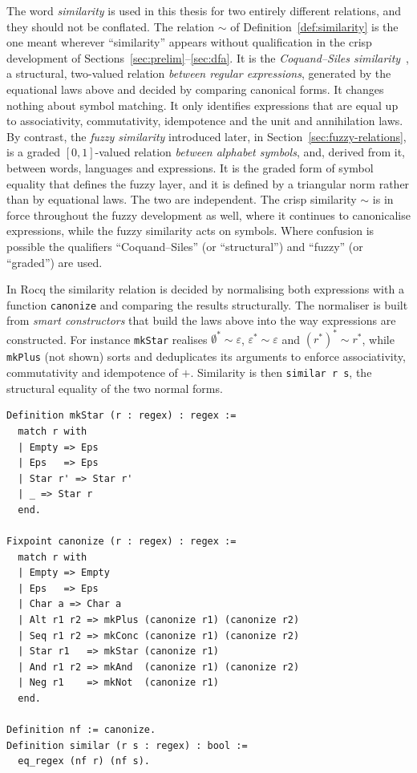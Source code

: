 \begin{remark}\label{rem:two-similarities}
The word \emph{similarity} is used in this thesis for two entirely different
relations, and they should not be conflated. The relation $\sim$ of
Definition~\ref{def:similarity} is the one meant wherever ``similarity''
appears without qualification in the crisp development of
Sections~\ref{sec:prelim}--\ref{sec:dfa}. It is the \emph{Coquand--Siles
similarity}~\cite{CoquandRegexEquality}, a structural, two-valued relation
\emph{between regular expressions}, generated by the equational laws above and
decided by comparing canonical forms. It changes nothing about symbol matching. It
only identifies expressions that are equal up to associativity, commutativity,
idempotence and the unit and annihilation laws. By contrast, the \emph{fuzzy similarity} 
introduced later, in
Section~\ref{sec:fuzzy-relations}, is a graded $[0,1]$-valued relation
\emph{between alphabet symbols}, and, derived from it, between words, languages and
expressions. It is the graded form of symbol equality that defines the fuzzy layer,
and it is defined by a triangular norm rather than by equational laws. The two are
independent. The crisp similarity $\sim$ is in force throughout the fuzzy
development as well, where it continues to canonicalise expressions, while the fuzzy
similarity acts on symbols. Where confusion is possible the qualifiers
``Coquand--Siles'' (or ``structural'') and ``fuzzy'' (or ``graded'') are used.
\end{remark}

In Rocq the similarity relation is decided by normalising both expressions with a
function \texttt{canonize} and comparing the results structurally. The normaliser
is built from \emph{smart constructors} that build the laws above into the way
expressions are constructed. For instance \texttt{mkStar} realises
$\emptyset^{*}\sim\varepsilon$, $\varepsilon^{*}\sim\varepsilon$ and
$(r^{*})^{*}\sim r^{*}$, while \texttt{mkPlus} (not shown) sorts and deduplicates
its arguments to enforce associativity, commutativity and idempotence of $+$.
Similarity is then \texttt{similar r s}, the structural equality of the two normal
forms.

\begin{lstlisting}[style=rocqstyle,caption={Smart constructors and normalisation (\texttt{Canonicalization.v}).},label={lst:canon}]
Definition mkStar (r : regex) : regex :=
  match r with
  | Empty => Eps
  | Eps   => Eps
  | Star r' => Star r'
  | _ => Star r
  end.

Fixpoint canonize (r : regex) : regex :=
  match r with
  | Empty => Empty
  | Eps   => Eps
  | Char a => Char a
  | Alt r1 r2 => mkPlus (canonize r1) (canonize r2)
  | Seq r1 r2 => mkConc (canonize r1) (canonize r2)
  | Star r1   => mkStar (canonize r1)
  | And r1 r2 => mkAnd  (canonize r1) (canonize r2)
  | Neg r1    => mkNot  (canonize r1)
  end.

Definition nf := canonize.
Definition similar (r s : regex) : bool :=
  eq_regex (nf r) (nf s).
\end{lstlisting}

